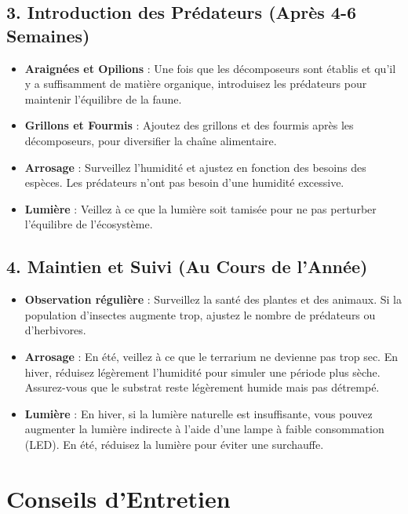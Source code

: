 \subsection*{3. Introduction des Prédateurs (Après 4-6 Semaines)}
\begin{itemize}
    \item \textbf{Araignées et Opilions} : Une fois que les décomposeurs sont établis et qu'il y a suffisamment de matière organique, introduisez les prédateurs pour maintenir l'équilibre de la faune.
    \item \textbf{Grillons et Fourmis} : Ajoutez des grillons et des fourmis après les décomposeurs, pour diversifier la chaîne alimentaire.
    \item \textbf{Arrosage} : Surveillez l'humidité et ajustez en fonction des besoins des espèces. Les prédateurs n'ont pas besoin d'une humidité excessive.
    \item \textbf{Lumière} : Veillez à ce que la lumière soit tamisée pour ne pas perturber l'équilibre de l'écosystème.
\end{itemize}

\subsection*{4. Maintien et Suivi (Au Cours de l'Année)}
\begin{itemize}
    \item \textbf{Observation régulière} : Surveillez la santé des plantes et des animaux. Si la population d'insectes augmente trop, ajustez le nombre de prédateurs ou d'herbivores.
    \item \textbf{Arrosage} : En été, veillez à ce que le terrarium ne devienne pas trop sec. En hiver, réduisez légèrement l'humidité pour simuler une période plus sèche. Assurez-vous que le substrat reste légèrement humide mais pas détrempé.
    \item \textbf{Lumière} : En hiver, si la lumière naturelle est insuffisante, vous pouvez augmenter la lumière indirecte à l'aide d'une lampe à faible consommation (LED). En été, réduisez la lumière pour éviter une surchauffe.
\end{itemize}

\section*{Conseils d'Entretien}

